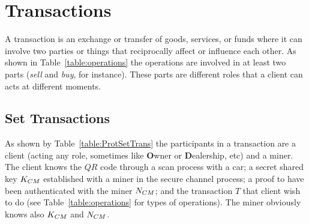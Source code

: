 \section{Transactions}
\label{sec:transactions}
A transaction is an exchange or transfer of goods, services, or funds where it can involve 
two parties or things that reciprocally affect or influence each other. 
As shown in Table~\ref{table:operations} the operations are involved in at least two parts (\textit{sell} and \textit{buy}, for instance). These parts are different roles that a client can 
acts at different moments.





\subsection{Set Transactions} 
\label{ssec:setTrans}
As shown by Table~\ref{table:ProtSetTrans} the participants in a transaction 
are a client (acting any role, sometimes like \textbf{O}wner or \textbf{D}ealership, etc) and a miner.
The client knows the $QR$ code through a scan process with
a car; a secret shared key $K_{CM}$ established with
a miner in the secure channel process; a proof to have been authenticated
with the miner $N_{CM}$; and the transaction $T$ that client wish 
to do  (see Table~\ref{table:operations} for types of operations). 
The miner obviously knows also $K_{CM}$ and $N_{CM}$. 
